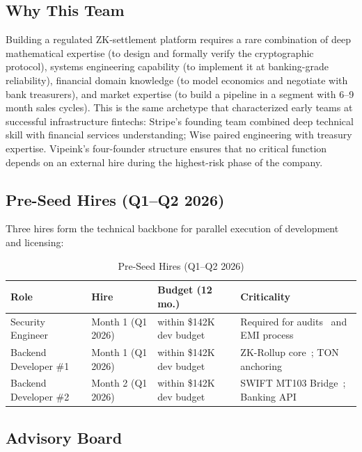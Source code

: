 \documentclass[11pt,a4paper]{article}
\begin{document}
\subsection*{Why This Team}

Building a regulated ZK-settlement platform requires a rare combination of deep mathematical expertise (to design and formally verify the cryptographic protocol), systems engineering capability (to implement it at banking-grade reliability), financial domain knowledge (to model economics and negotiate with bank treasurers), and market expertise (to build a pipeline in a segment with 6--9 month sales cycles). This is the same archetype that characterized early teams at successful infrastructure fintechs: Stripe's founding team combined deep technical skill with financial services understanding; Wise paired engineering with treasury expertise. Vipeink's four-founder structure ensures that no critical function depends on an external hire during the highest-risk phase of the company.

\subsection*{Pre-Seed Hires (Q1--Q2 2026)}

Three hires form the technical backbone for parallel execution of development and licensing:

\begin{table}[htbp]
\centering
\caption{Pre-Seed Hires (Q1--Q2 2026)}
\begin{tabularx}{\linewidth}{@{}X l l X@{}}
\toprule
\textbf{Role} & \textbf{Hire} & \textbf{Budget (12 mo.)} & \textbf{Criticality} \\
\midrule
Security Engineer
& Month 1 (Q1 2026)
& within \$142K dev budget
& Required for audits~\cite{tiber_eu,iso27001} and EMI process~\cite{lb_emi} \\
Backend Developer \#1
& Month 1 (Q1 2026)
& within \$142K dev budget
& ZK-Rollup core~\cite{plonky2}; TON anchoring~\cite{ton_wp} \\
Backend Developer \#2
& Month 2 (Q1 2026)
& within \$142K dev budget
& SWIFT MT103 Bridge~\cite{swift_mt103}; Banking API \\
\bottomrule
\end{tabularx}
\end{table}

\subsection*{Advisory Board}
\end{document}
